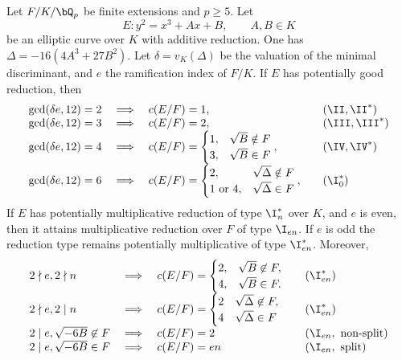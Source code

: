 \begin{lemma}\label{tamagawa-num}
    Let $F /K / \bQ_p$ be finite extensions and $p \geq 5$. Let
    $$E \colon  y^2 = x^3 + Ax + B, \qquad A, B \in K$$
    be an elliptic curve over $K$ with additive reduction. One has $\Delta = -16(4A^3 + 27 B^2)$. Let $\delta=v_K(\Delta)$ be the valuation of the minimal discriminant, and $e$ the ramification index of $F/K$.
    If $E$ has potentially good reduction, then 
        \[
        \begin{array}{l l l l}
            \gcd(\delta e, 12) = 2 & \implies & c(E / F) = 1, & \quad (\II, \II^*) \\
            \gcd(\delta e, 12) = 3 & \implies & c(E / F) = 2, & \quad (\III, \III^*) \\
            \gcd(\delta e, 12) = 4 & \implies & c(E / F) = \begin{cases} 1, & \sqrt{B} \notin F
                                \\ 3, & \sqrt{B} \in F \end{cases}, & \quad (\IV, \IV^*) \\
            \gcd(\delta e, 12) = 6 & \implies & c(E / F) = \begin{cases} 2, & \sqrt{\Delta} \notin F
                \\ 1 \ \text{or} \ 4, & \sqrt{\Delta} \in F \end{cases}, & \quad (\I_0^*) 
        \end{array}
        \]
    If $E$ has potentially multiplicative reduction of type $\I_n^*$ over $K$,
    and $e$ is even, then it attains multiplicative reduction over $F$ of type $\I_{en}$. If $e$ is odd the reduction type remains potentially multiplicative of type $\I_{en}^*$. Moreover, 
    \[
        \begin{array}{l l l l}
        2 \nmid e, 2 \nmid n & \implies & c(E / F) = \begin{cases} 2, & \sqrt{B} \not\in F, \\ 4, & \sqrt{B} \in F. \end{cases} & \quad (\I_{en}^*) \\

        2 \nmid e, 2 \mid n & \implies & c(E / F) = \begin{cases} 2 & \sqrt{\Delta} \not\in F, \\ 4 & \sqrt{\Delta} \in F \end{cases} & \quad ({\I_{en}^*}) \\

        2 \mid e, \sqrt{-6 B} \not\in F & \implies & c(E / F ) = 2 & \quad (\I_{en}, \text{ non-split}) \\
        2 \mid e, \sqrt{-6 B} \in F & \implies & c(E / F) = en & \quad (\I_{en}, \text{ split})
        \end{array} 
    \]
\end{lemma}

